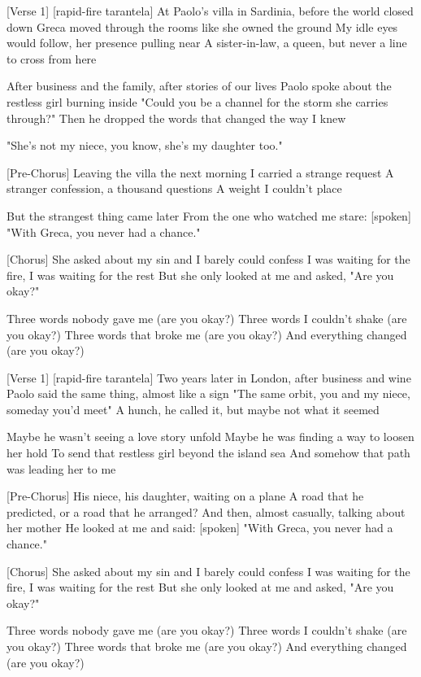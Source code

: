 [Verse 1]
[rapid-fire tarantela]
At Paolo's villa in Sardinia, before the world closed down
Greca moved through the rooms like she owned the ground
My idle eyes would follow, her presence pulling near
A sister-in-law, a queen, but never a line to cross from here

After business and the family, after stories of our lives
Paolo spoke about the restless girl burning inside
"Could you be a channel for the storm she carries through?"
Then he dropped the words that changed the way I knew

"She's not my niece, you know, she's my daughter too."

[Pre-Chorus]
Leaving the villa the next morning
I carried a strange request
A stranger confession, a thousand questions
A weight I couldn't place

But the strangest thing came later
From the one who watched me stare:
[spoken]
"With Greca, you never had a chance."

[Chorus]
She asked about my sin and I barely could confess
I was waiting for the fire, I was waiting for the rest
But she only looked at me and asked, "Are you okay?"

Three words nobody gave me (are you okay?)
Three words I couldn't shake (are you okay?)
Three words that broke me (are you okay?)
And everything changed (are you okay?)

[Verse 1]
[rapid-fire tarantela]
Two years later in London, after business and wine
Paolo said the same thing, almost like a sign
"The same orbit, you and my niece, someday you'd meet"
A hunch, he called it, but maybe not what it seemed

Maybe he wasn't seeing a love story unfold
Maybe he was finding a way to loosen her hold
To send that restless girl beyond the island sea
And somehow that path was leading her to me

[Pre-Chorus]
His niece, his daughter, waiting on a plane
A road that he predicted, or a road that he arranged?
And then, almost casually, talking about her mother
He looked at me and said:
[spoken]
"With Greca, you never had a chance."

[Chorus]
She asked about my sin and I barely could confess
I was waiting for the fire, I was waiting for the rest
But she only looked at me and asked, "Are you okay?"

Three words nobody gave me (are you okay?)
Three words I couldn't shake (are you okay?)
Three words that broke me (are you okay?)
And everything changed (are you okay?)

